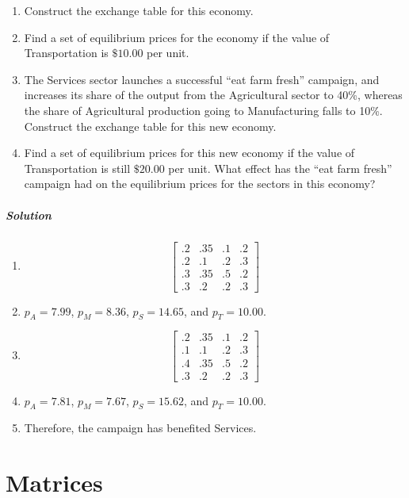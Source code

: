 \documentclass[oneside]{book} %
\theoremstyle{plain}
\begin{document}
\begin{enumerate}
\item Construct the exchange table for this economy.
\item Find a set of equilibrium prices for the economy if the value of
  Transportation is \(\$10.00\) per unit.
\item {The Services sector launches a successful ``eat farm fresh'' campaign,
       and increases its share of the output from the Agricultural sector to
40\%,
       whereas the share of Agricultural production going to Manufacturing falls
to 10\%.
       Construct the exchange table for this new economy.}
\item {Find a set of equilibrium prices for this new economy if the value of
    Transportation is still \(\$20.00\) per unit.
       What effect has the ``eat farm fresh'' campaign had on the equilibrium
prices for the sectors in this economy?}
\end{enumerate}

\subparagraph{Solution}

\begin{enumerate}
  \item {
  \[ \begin{bmatrix}
.2 & .35 & .1 & .2 \\
.2 &  .1 & .2 & .3 \\
.3 & .35 & .5 & .2 \\
.3 &  .2 & .2 & .3
      \end{bmatrix} \]}
  \item{\(p_A = 7.99\), \(p_M = 8.36\), \(p_S = 14.65\), and \(p_T = 10.00\).}
  \item {\[ \begin{bmatrix}
.2 & .35 & .1 & .2 \\
.1 &  .1 & .2 & .3 \\
.4 & .35 & .5 & .2 \\
.3 &  .2 & .2 & .3
            \end{bmatrix} \]}
  \item{\(p_A = 7.81\), \(p_M = 7.67\), \(p_S = 15.62\), and \(p_T = 10.00\).}
  \item{Therefore, the campaign has benefited Services.}
\end{enumerate}

\section{Matrices}
\end{document}
